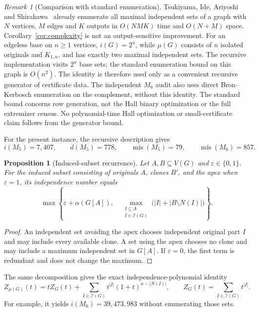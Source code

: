 \documentclass[11pt,letterpaper]{article}
\newtheorem{proposition}[theorem]{Proposition}
\theoremstyle{remark}
\newtheorem{remark}[theorem]{Remark}
\newcommand{\mi}{\operatorname{mis}}
\newcommand{\ind}{\mathcal I}
\newcommand{\abs}[1]{\lvert #1\rvert}
\begin{document}
\begin{remark}[Comparison with standard enumeration]\label{rem:positioning}
Tsukiyama, Ide, Ariyoshi and Shirakawa~\cite{Tsukiyama} already enumerate
all maximal independent sets of a graph with $N$ vertices, $M$ edges and
$K$ outputs in $O(NMK)$ time and $O(N+M)$ space. Corollary~\ref{cor:complexity}
is not an output-sensitive improvement. For an edgeless base on $n\ge1$
vertices, $i(G)=2^n$, while $\mu(G)$ consists of $n$ isolated originals and
$K_{1,n}$, and has exactly two maximal independent sets. The recursive
implementation visits $2^n$ base sets; the standard enumeration bound on
this graph is $O(n^2)$. The identity is therefore used only as a convenient
recursive generator of certificate data. The independent $M_6$ audit also
uses direct Bron--Kerbosch enumeration on the complement, without this
identity. The standard bound concerns row generation, not the Hall binary optimization
or the full extremizer census. No polynomial-time Hall optimization or
small-certificate claim follows from the generator bound.
\end{remark}
For the present instance, the recursive description gives
\begin{equation}\label{eq:counts}
 i(M_5)=7,407,\qquad d(M_5)=778,\qquad \mi(M_5)=79,
 \qquad \mi(M_6)=857.
\end{equation}

\begin{proposition}[Induced-subset recurrence]\label{prop:recurrence}
Let $A,B\subseteq V(G)$ and $\varepsilon\in\{0,1\}$. For the induced subset
consisting of originals $A$, clones $B'$, and the apex when
$\varepsilon=1$, its independence number equals
\begin{equation}\label{eq:recurrence}
 \max\left\{\varepsilon+\alpha(G[A]),\quad
 \max_{\substack{I\subseteq A\\ I\in\ind(G)}}
 \bigl(\abs I+\abs{B\setminus N(I)}\bigr)\right\}.
\end{equation}
\end{proposition}
\begin{proof}
An independent set avoiding the apex chooses independent original part
$I$ and may include every available clone. A set using the apex chooses
no clone and may include a maximum independent set in $G[A]$. If
$\varepsilon=0$, the first term is redundant and does not change the
maximum.
\end{proof}
The same decomposition gives the exact independence-polynomial identity
\[
 Z_{\mu(G)}(t)=tZ_G(t)+\sum_{I\in\ind(G)}t^{\abs I}
 (1+t)^{n-\abs{N(I)}},\qquad
 Z_G(t)=\sum_{I\in\ind(G)}t^{\abs I}.
\]
For example, it yields $i(M_6)=39,473,983$ without enumerating those sets.
\end{document}
